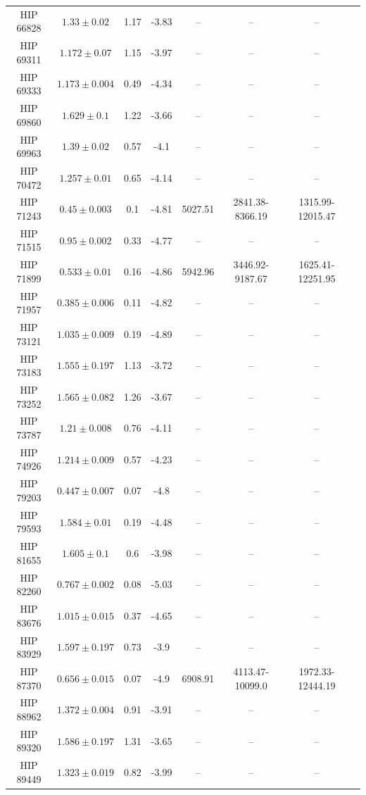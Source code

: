 \begin{longtable}{|c|c|c|c|c|c|c|c|}
HIP 66828 & $ 1.33 \pm 0.02 $ & 1.17 & -3.83 &-- &-- &-- \\
HIP 69311 & $ 1.172 \pm 0.07 $ & 1.15 & -3.97 &-- &-- &-- \\
HIP 69333 & $ 1.173 \pm 0.004 $ & 0.49 & -4.34 &-- &-- &-- \\
HIP 69860 & $ 1.629 \pm 0.1 $ & 1.22 & -3.66 &-- &-- &-- \\
HIP 69963 & $ 1.39 \pm 0.02 $ & 0.57 & -4.1 &-- &-- &-- \\
HIP 70472 & $ 1.257 \pm 0.01 $ & 0.65 & -4.14 &-- &-- &-- \\
HIP 71243 & $ 0.45 \pm 0.003 $ & 0.1 & -4.81 & 5027.51 & 2841.38-8366.19 & 1315.99-12015.47 \\
HIP 71515 & $ 0.95 \pm 0.002 $ & 0.33 & -4.77 &-- &-- &-- \\
HIP 71899 & $ 0.533 \pm 0.01 $ & 0.16 & -4.86 & 5942.96 & 3446.92-9187.67 & 1625.41-12251.95 \\
HIP 71957 & $ 0.385 \pm 0.006 $ & 0.11 & -4.82 &-- &-- &-- \\
HIP 73121 & $ 1.035 \pm 0.009 $ & 0.19 & -4.89 &-- &-- &-- \\
HIP 73183 & $ 1.555 \pm 0.197 $ & 1.13 & -3.72 &-- &-- &-- \\
HIP 73252 & $ 1.565 \pm 0.082 $ & 1.26 & -3.67 &-- &-- &-- \\
HIP 73787 & $ 1.21 \pm 0.008 $ & 0.76 & -4.11 &-- &-- &-- \\
HIP 74926 & $ 1.214 \pm 0.009 $ & 0.57 & -4.23 &-- &-- &-- \\
HIP 79203 & $ 0.447 \pm 0.007 $ & 0.07 & -4.8 &-- &-- &-- \\
HIP 79593 & $ 1.584 \pm 0.01 $ & 0.19 & -4.48 &-- &-- &-- \\
HIP 81655 & $ 1.605 \pm 0.1 $ & 0.6 & -3.98 &-- &-- &-- \\
HIP 82260 & $ 0.767 \pm 0.002 $ & 0.08 & -5.03 &-- &-- &-- \\
HIP 83676 & $ 1.015 \pm 0.015 $ & 0.37 & -4.65 &-- &-- &-- \\
HIP 83929 & $ 1.597 \pm 0.197 $ & 0.73 & -3.9 &-- &-- &-- \\
HIP 87370 & $ 0.656 \pm 0.015 $ & 0.07 & -4.9 & 6908.91 & 4113.47-10099.0 & 1972.33-12444.19 \\
HIP 88962 & $ 1.372 \pm 0.004 $ & 0.91 & -3.91 &-- &-- &-- \\
HIP 89320 & $ 1.586 \pm 0.197 $ & 1.31 & -3.65 &-- &-- &-- \\
HIP 89449 & $ 1.323 \pm 0.019 $ & 0.82 & -3.99 &-- &-- &-- \\

\end{longtable}

